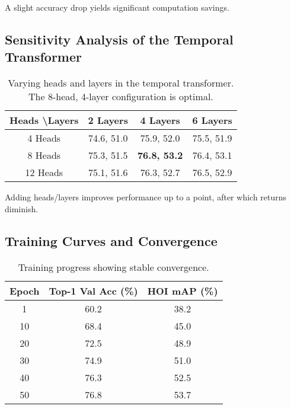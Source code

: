 \documentclass{article}
\begin{document}
A slight accuracy drop yields significant computation savings.

\subsection{Sensitivity Analysis of the Temporal Transformer}
\label{sec:sensitivity_analysis}

\begin{table}[h]
\centering
\caption{Varying heads and layers in the temporal transformer. The 8-head, 4-layer configuration is optimal.}
\label{tab:sensitivity_analysis}
\vskip 0.15in
\begin{small}
\begin{sc}
\begin{tabular}{c|ccc}
\toprule
Heads \textbackslash Layers & 2 Layers & 4 Layers & 6 Layers \\
\midrule
4 Heads     & 74.6, 51.0 & 75.9, 52.0 & 75.5, 51.9 \\
8 Heads     & 75.3, 51.5 & \textbf{76.8, 53.2} & 76.4, 53.1 \\
12 Heads    & 75.1, 51.6 & 76.3, 52.7 & 76.5, 52.9 \\
\bottomrule
\end{tabular}
\end{sc}
\end{small}
\vskip -0.1in
\end{table}

Adding heads/layers improves performance up to a point, after which returns diminish.

\subsection{Training Curves and Convergence}
\label{sec:training_curves}

\begin{table}[h]
\centering
\caption{Training progress showing stable convergence.}
\label{tab:training_curves}
\vskip 0.15in
\begin{small}
\begin{sc}
\begin{tabular}{c|cc}
\toprule
Epoch & Top-1 Val Acc (\%) & HOI mAP (\%) \\
\midrule
1   & 60.2 & 38.2 \\
10  & 68.4 & 45.0 \\
20  & 72.5 & 48.9 \\
30  & 74.9 & 51.0 \\
40  & 76.3 & 52.5 \\
50  & 76.8 & 53.7 \\
\bottomrule
\end{tabular}
\end{sc}
\end{small}
\vskip -0.1in
\end{table}
\end{document}
